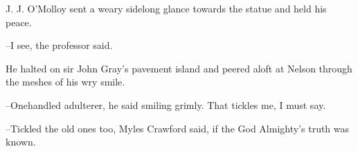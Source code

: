 
J. J. O'Molloy sent a weary sidelong glance towards the statue and
held his peace.

--I see, the professor said.

He halted on sir John Gray's pavement island and peered aloft at Nelson
through the meshes of his wry smile.



--Onehandled adulterer, he said smiling grimly. That tickles me, I must
say.

--Tickled the old ones too, Myles Crawford said, if the God Almighty's
truth was known.


